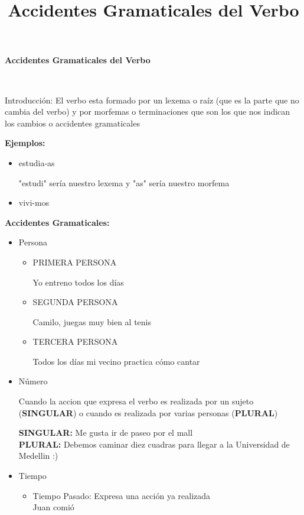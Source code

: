 \documentclass[•]{article}
\begin{document}
	\title{Accidentes Gramaticales del Verbo}
	
	\begin{center}
	\textbf{\Large{Accidentes Gramaticales del Verbo}}
	\end{center}
	

\begin{flushleft}\

Introducci\'on:
El verbo esta formado por un lexema o ra\'iz (que es la parte que no cambia del verbo) y por morfemas o terminaciones que son los que nos indican los cambios o accidentes gramaticales
	
	\textbf{Ejemplos:}
	\begin{itemize}
	\item estudia-as
	
	"estudi" ser\'ia nuestro lexema y "as" ser\'ia nuestro morfema
	\item vivi-mos
	\end{itemize}
	
	\textbf{Accidentes Gramaticales: }
	\begin{itemize}
	
	\item Persona
	\begin{itemize}
		\item PRIMERA PERSONA
		
		Yo entreno todos los d\'ias
		\item SEGUNDA PERSONA
		
		Camilo, juegas muy bien al tenis
		\item TERCERA PERSONA
		
		Todos los d\'ias mi vecino practica c\'omo cantar
	\end{itemize}
	\item N\'umero
	
	Cuando la accion que expresa el verbo es realizada por un sujeto (\textbf{SINGULAR}) o cuando es realizada por varias personas (\textbf{PLURAL})
	
	\textbf{SINGULAR:}
	Me gusta ir de paseo por el mall \\
	\textbf{PLURAL: }
	Debemos caminar diez cuadras para llegar a la Universidad de Medellin :)
	
	\item Tiempo
	
	\begin{itemize}
		\item Tiempo Pasado: Expresa una acci\'on ya realizada \\ Juan comi\'o
		

\end{itemize}
\end{itemize}
\end{flushleft}
\end{document}
